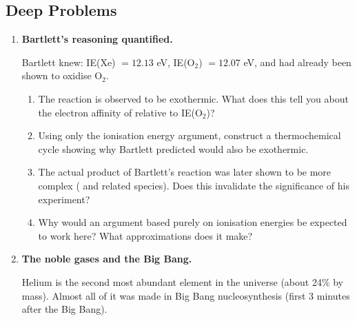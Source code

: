 \documentclass[12pt, a4paper]{book}
\begin{document}
\subsection*{Deep Problems}

\begin{deepbox}
\begin{enumerate}[label=\textbf{D\arabic*.}]

  \item \textbf{Bartlett's reasoning quantified.}

        Bartlett knew: IE(Xe) $= 12.13$ eV,
        IE(O$_2$) $= 12.07$ eV,
        and  had already been shown to oxidise O$_2$.

        \begin{enumerate}[label=(\alph*)]
          \item The reaction 
                is observed to be exothermic.
                What does this tell you about the electron
                affinity of  relative to IE(O$_2$)?
          \item Using only the ionisation energy argument,
                construct a thermochemical cycle showing why
                Bartlett predicted 
                would also be exothermic.
          \item The actual product of Bartlett's reaction
                was later shown to be more complex
                (\ce{[XeF]+[PtF6]-} and related species).
                Does this invalidate the significance of
                his experiment?
          \item Why would an argument based purely on
                ionisation energies be expected to work here?
                What approximations does it make?
        \end{enumerate}

  \item \textbf{The noble gases and the Big Bang.}

        Helium is the second most abundant element in the
        universe (about 24\% by mass).
        Almost all of it was made in Big Bang nucleosynthesis
        (first 3 minutes after the Big Bang).


\end{enumerate}
\end{deepbox}
\end{document}
